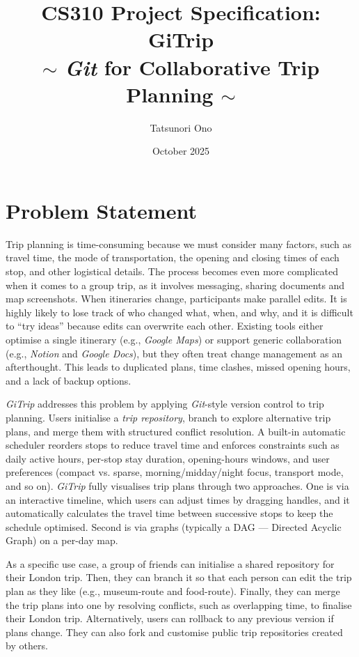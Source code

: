 \documentclass{article}
\title{\textbf{CS310 Project Specification:\\
GiTrip\\
\vspace{-1.5mm}
$\sim$ \textit{Git} for Collaborative Trip Planning $\sim$}}
\author{Tatsunori Ono}
\date{October 2025}
\begin{document}
\maketitle

\section{Problem Statement}

Trip planning is time-consuming because we must consider many factors, such as travel time, the mode of transportation, the opening and closing times of each stop, and other logistical details. The process becomes even more complicated when it comes to a group trip, as it involves messaging, sharing documents and map screenshots. When itineraries change, participants make parallel edits. It is highly likely to lose track of who changed what, when, and why, and it is difficult to ``try ideas'' because edits can overwrite each other. Existing tools either optimise a single itinerary (e.g., \textit{Google Maps}) or support generic collaboration (e.g., \textit{Notion} and \textit{Google Docs}), but they often treat change management as an afterthought. This leads to duplicated plans, time clashes, missed opening hours, and a lack of backup options.

\textit{GiTrip} addresses this problem by applying \textit{Git}\cite{git}-style version control to trip planning. Users initialise a \emph{trip repository}, branch to explore alternative trip plans, and merge them with structured conflict resolution. A built-in automatic scheduler reorders stops to reduce travel time and enforces constraints such as daily active hours, per-stop stay duration, opening-hours windows, and user preferences (compact vs. sparse, morning/midday/night focus, transport mode, and so on). \textit{GiTrip} fully visualises trip plans through two approaches. One is via an interactive timeline, which users can adjust times by dragging handles, and it automatically
calculates the travel time between successive stops to keep the schedule optimised. Second is via graphs (typically a DAG --- Directed Acyclic Graph) on a per-day map.

As a specific use case, a group of friends can initialise a shared repository for their London trip. Then, they can branch it so that each person can edit the trip plan as they like (e.g., museum-route and food-route). Finally, they can merge the trip plans into one by resolving conflicts, such as overlapping time, to finalise their London trip. Alternatively, users can rollback to any previous version if plans change. They can also fork and customise public trip repositories created by others.
\end{document}
